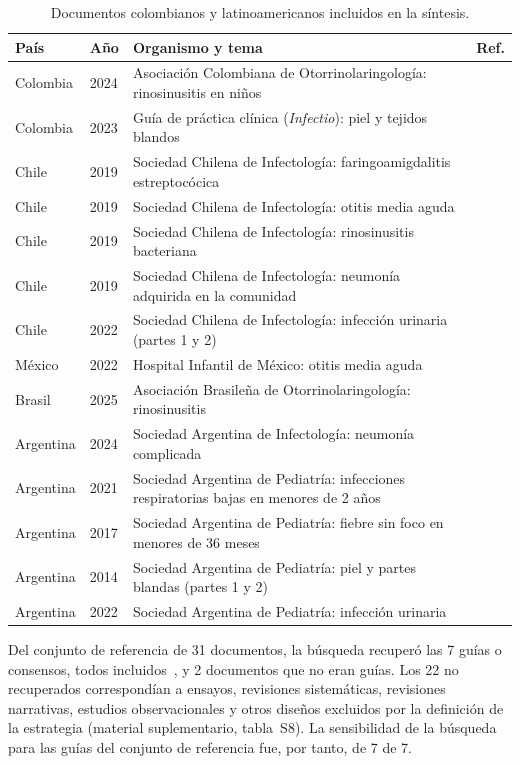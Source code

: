 \documentclass[11pt,a4paper]{article}
\begin{document}
\begin{table}[htbp]
\centering
\caption{Documentos colombianos y latinoamericanos incluidos en la síntesis.}
\label{tab:latam}
\small
\begin{tabularx}{\textwidth}{@{}llXr@{}}
\toprule
País & Año & Organismo y tema & Ref. \\
\midrule
Colombia & 2024 & Asociación Colombiana de Otorrinolaringología: rinosinusitis en niños & \citep{acorlrs2024} \\
Colombia & 2023 & Guía de práctica clínica (\emph{Infectio}): piel y tejidos blandos & \citep{acin2023} \\
Chile & 2019 & Sociedad Chilena de Infectología: faringoamigdalitis estreptocócica & \citep{chilefaa2019} \\
Chile & 2019 & Sociedad Chilena de Infectología: otitis media aguda & \citep{chileoma2019} \\
Chile & 2019 & Sociedad Chilena de Infectología: rinosinusitis bacteriana & \citep{chilers2019} \\
Chile & 2019 & Sociedad Chilena de Infectología: neumonía adquirida en la comunidad & \citep{chilenac2019} \\
Chile & 2022 & Sociedad Chilena de Infectología: infección urinaria (partes 1 y 2) & \citep{chileitu2022} \\
México & 2022 & Hospital Infantil de México: otitis media aguda & \citep{mexicooma2022} \\
Brasil & 2025 & Asociación Brasileña de Otorrinolaringología: rinosinusitis & \citep{brasilrs2025} \\
Argentina & 2024 & Sociedad Argentina de Infectología: neumonía complicada & \citep{sadi2024} \\
Argentina & 2021 & Sociedad Argentina de Pediatría: infecciones respiratorias bajas en menores de 2 años & \citep{sapiras2021} \\
Argentina & 2017 & Sociedad Argentina de Pediatría: fiebre sin foco en menores de 36 meses & \citep{sapfiebre2017} \\
Argentina & 2014 & Sociedad Argentina de Pediatría: piel y partes blandas (partes 1 y 2) & \citep{sappiel2014a,sappiel2014} \\
Argentina & 2022 & Sociedad Argentina de Pediatría: infección urinaria & \citep{sapitu2022} \\
\bottomrule
\end{tabularx}
\end{table}

Del conjunto de referencia de 31 documentos, la búsqueda recuperó las 7 guías o consensos, todos incluidos~\citep{castelli2025,marchisio2019,chiappini2024,backman2025,china2025,cohen2017,codepeh2019}, y 2 documentos que no eran guías. Los 22 no recuperados correspondían a ensayos, revisiones sistemáticas, revisiones narrativas, estudios observacionales y otros diseños excluidos por la definición de la estrategia (material suplementario, tabla~S8). La sensibilidad de la búsqueda para las guías del conjunto de referencia fue, por tanto, de 7 de 7.
\end{document}
